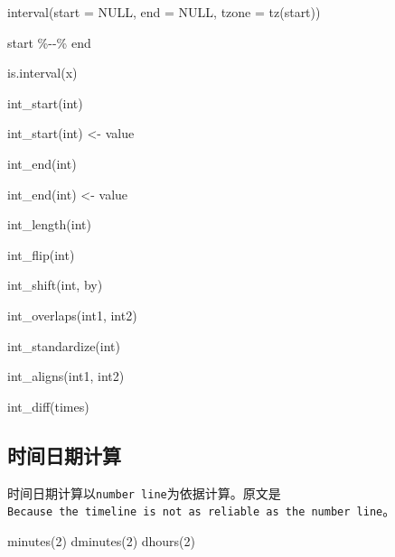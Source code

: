 \documentclass[
]{book}
\newenvironment{Shaded}{\begin{snugshade}}{\end{snugshade}}
\newcommand{\AttributeTok}[1]{\textcolor[rgb]{0.77,0.63,0.00}{#1}}
\newcommand{\ConstantTok}[1]{\textcolor[rgb]{0.00,0.00,0.00}{#1}}
\newcommand{\DecValTok}[1]{\textcolor[rgb]{0.00,0.00,0.81}{#1}}
\newcommand{\FunctionTok}[1]{\textcolor[rgb]{0.00,0.00,0.00}{#1}}
\newcommand{\NormalTok}[1]{#1}
\newcommand{\OtherTok}[1]{\textcolor[rgb]{0.56,0.35,0.01}{#1}}
\newcommand{\SpecialCharTok}[1]{\textcolor[rgb]{0.00,0.00,0.00}{#1}}
\begin{document}
\begin{Shaded}
\begin{Highlighting}[]
\FunctionTok{interval}\NormalTok{(}\AttributeTok{start =} \ConstantTok{NULL}\NormalTok{, }\AttributeTok{end =} \ConstantTok{NULL}\NormalTok{, }\AttributeTok{tzone =} \FunctionTok{tz}\NormalTok{(start))}

\NormalTok{start }\SpecialCharTok{\%{-}{-}\%}\NormalTok{ end}

\FunctionTok{is.interval}\NormalTok{(x)}

\FunctionTok{int\_start}\NormalTok{(int)}

\FunctionTok{int\_start}\NormalTok{(int) }\OtherTok{\textless{}{-}}\NormalTok{ value}

\FunctionTok{int\_end}\NormalTok{(int)}

\FunctionTok{int\_end}\NormalTok{(int) }\OtherTok{\textless{}{-}}\NormalTok{ value}

\FunctionTok{int\_length}\NormalTok{(int)}

\FunctionTok{int\_flip}\NormalTok{(int)}

\FunctionTok{int\_shift}\NormalTok{(int, by)}

\FunctionTok{int\_overlaps}\NormalTok{(int1, int2)}

\FunctionTok{int\_standardize}\NormalTok{(int)}

\FunctionTok{int\_aligns}\NormalTok{(int1, int2)}

\FunctionTok{int\_diff}\NormalTok{(times)}
\end{Highlighting}
\end{Shaded}

\hypertarget{ux65f6ux95f4ux65e5ux671fux8ba1ux7b97}{%
\subsection{时间日期计算}\label{ux65f6ux95f4ux65e5ux671fux8ba1ux7b97}}

时间日期计算以\texttt{number\ line}为依据计算。原文是\texttt{Because\ the\ timeline\ is\ not\ as\ reliable\ as\ the\ number\ line}。

\begin{Shaded}
\begin{Highlighting}[]
\FunctionTok{minutes}\NormalTok{(}\DecValTok{2}\NormalTok{)}
\FunctionTok{dminutes}\NormalTok{(}\DecValTok{2}\NormalTok{)}
\FunctionTok{dhours}\NormalTok{(}\DecValTok{2}\NormalTok{)}
\end{Highlighting}
\end{Shaded}
\end{document}
